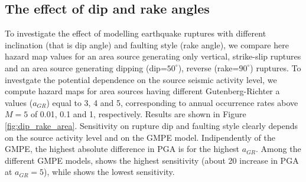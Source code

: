 \subsection{The effect of dip and rake angles}
To investigate the effect of modelling earthquake ruptures with different inclination (that is dip angle) and
faulting style (rake angle), we compare here hazard map values for an area source generating only vertical,
strike-slip ruptures and an area source generating dipping (dip=$50^{\circ}$), reverse (rake=$90^{\circ}$) ruptures.
To investgate the potential dependence on the source seismic activity level, we compute hazard maps for
area sources having different Gutenberg-Richter a values ($a_{GR}$) equal to 3, 4 and 5, corresponding to
annual occurrence rates above $M=5$ of 0.01, 0.1 and 1, respectively. Results are shown in Figure \ref{fig:dip_rake_area}. Sensitivity on rupture dip and faulting style clearly depends on the source activity level and on the GMPE model. Indipendently of the GMPE, the highest absolute difference in PGA is for the highest $a_{GR}$. Among the different GMPE models, \cite{campbell2008} shows the highest sensitivity (about 20 %
increase in PGA at $a_{GR}=5$), while \cite{boore2008} shows the lowest sensitivity.
